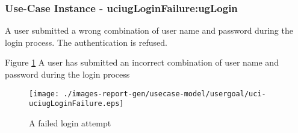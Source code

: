 
	\subsubsection{Use-Case Instance - uciugLoginFailure:ugLogin}
	
	A user submitted a wrong combination of user name and password during the login process. The authentication is refused.		  
	\begin{operationmodel}
	
	\end{operationmodel} 

	
	Figure \ref{fig:lu.uni.lassy.excalibur.examples.icrash-RE-UC-uci-uciugLoginFailure}
	A user has submitted an incorrect combination of user name and password during the login process
	
	\begin{figure}[htbp]
	\begin{center}
	
	\texttt{[image: ./images-report-gen/usecase-model/usergoal/uci-uciugLoginFailure.eps]}
	\end{center}
	\caption[lu.uni.lassy.excalibur.examples.icrash Sequence Diagram: uci-uciugLoginFailure]{A failed login attempt}
	\label{fig:lu.uni.lassy.excalibur.examples.icrash-RE-UC-uci-uciugLoginFailure}
	\end{figure}
	\vspace{0.5cm}
